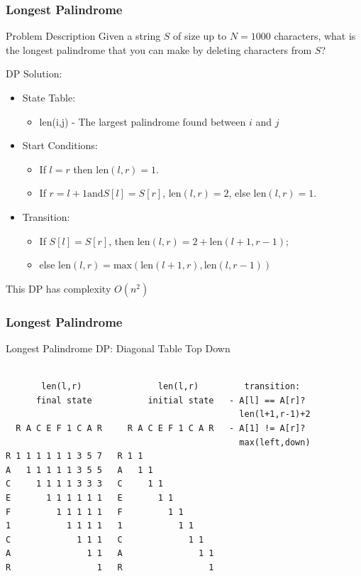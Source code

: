 \documentclass{beamer}
\begin{document}
\begin{frame}
  \frametitle{Longest Palindrome}
  {\smaller
    \begin{block}{Problem Description}
      Given a string $S$ of size up to $N = 1000$ characters, what is the
      longest palindrome that you can make by deleting characters from $S$?
    \end{block}

    DP Solution:
    \begin{itemize}
    \item State Table:
      {\smaller
      \begin{itemize}
      \item len(i,j) - The largest palindrome found between $i$ and $j$
      \end{itemize}}
    \item Start Conditions:
      {\smaller
      \begin{itemize}
        \item If $l=r$ then len$(l,r)=1$.
        \item If $r=l+1 \text{and} S[l]=S[r]$, len$(l,r)=2$, else len$(l,r)=1$.
      \end{itemize}}
    \item Transition:
      {\smaller
      \begin{itemize}
        \item If $S[l]=S[r]$, then len$(l,r)=2+\text{len}(l+1,r-1)$;
        \item else $\text{len}(l,r) = \text{max}(\text{len}(l+1,r),\text{len}(l,r-1))$
      \end{itemize}}
    \end{itemize}

    This DP has complexity $O(n^2)$

  }
\end{frame}

\begin{frame}[fragile]
  \frametitle{Longest Palindrome}

  Longest Palindrome DP: Diagonal Table Top Down

  {\smaller
\begin{verbatim}

       len(l,r)               len(l,r)         transition:
      final state           initial state   - A[l] == A[r]?
                                              len(l+1,r-1)+2
  R A C E F 1 C A R     R A C E F 1 C A R   - A[1] != A[r]?
                                              max(left,down)
R 1 1 1 1 1 1 3 5 7   R 1 1
A   1 1 1 1 1 3 5 5   A   1 1
C     1 1 1 1 3 3 3   C     1 1
E       1 1 1 1 1 1   E       1 1
F         1 1 1 1 1   F         1 1
1           1 1 1 1   1           1 1
C             1 1 1   C             1 1
A               1 1   A               1 1
R                 1   R                 1

\end{verbatim}

  }
\end{frame}
\end{document}
